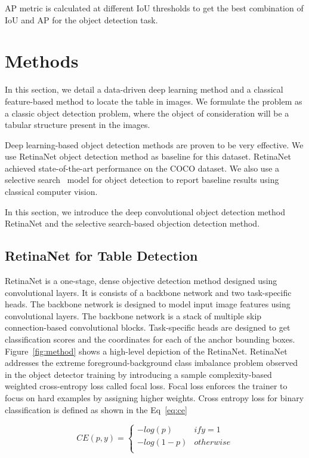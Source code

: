 \documentclass[a4paper,conference]{IEEEtran}
\begin{document}
AP metric is calculated at different IoU thresholds to get the best combination of IoU and AP for the object detection task. 



\section{Methods}



In this section, we detail a data-driven deep learning method and a classical feature-based method to locate the table in images. We formulate the problem as a classic object detection problem, where the object of consideration will be a tabular structure present in the images. 

Deep learning-based object detection methods are proven to be very effective. We use RetinaNet \cite{retinanet} object detection method as baseline for this dataset.
RetinaNet achieved state-of-the-art performance on the COCO \cite{coco} dataset.  
We also use a selective search~\cite{ss} model for object detection to report baseline results using classical computer vision. 

In this section, we introduce the deep convolutional object detection method RetinaNet and the selective search-based objection detection method.



\subsection{RetinaNet for Table Detection}
RetinaNet is a one-stage, dense objective detection method designed using convolutional layers. It is consists of a backbone network and two task-specific heads. The backbone network is designed to model input image features using convolutional layers. The backbone network is a stack of multiple skip connection-based convolutional blocks. Task-specific heads are designed to get classification scores and the coordinates for each of the anchor bounding boxes. Figure~\ref{fig:method} shows a high-level depiction of the RetinaNet.
RetinaNet addresses the extreme foreground-background class imbalance problem observed in the object detector training by introducing a sample complexity-based weighted cross-entropy loss called focal loss. Focal loss enforces the trainer to focus on hard examples by assigning higher weights. 
Cross entropy loss for binary classification is defined as shown in the Eq~\ref{eq:ce}

 \begin{equation}
CE(p, y) = \left\{
\begin{array}{ll}
      -log(p) & if y = 1 \\
      -log(1-p) & otherwise\\
\end{array} 
\right. 
\label{eq:ce}
\end{equation}
\end{document}
